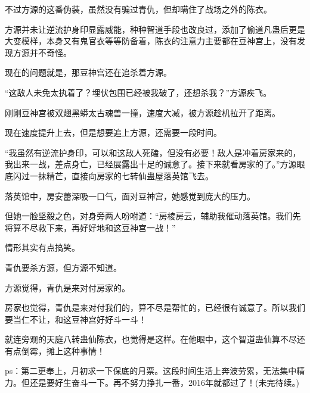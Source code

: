 \begin{this_body}
不过方源的这番伪装，虽然没有骗过青仇，但却瞒住了战场之外的陈衣。

方源并未让逆流护身印显露威能，种种智道手段也改良过，添加了偷道凡蛊后更是大变模样，本身又有鬼官衣等等防备着，陈衣的注意力主要都在豆神宫上，没有发现方源并不奇怪。

现在的问题就是，那豆神宫还在追杀着方源。

“这敌人未免太执着了？埋伏包围已经被我破了，还想杀我？”方源疾飞。

刚刚豆神宫被双翅黑蟒太古魂兽一撞，速度大减，被方源趁机拉开了距离。

现在速度提升上去，但是想要追上方源，还需要一段时间。

“我虽然有逆流护身印，可以和这敌人死磕，但没有必要！敌人是冲着房家来的，我出来一战，差点身亡，已经展露出十足的诚意了。接下来就看房家的了。”方源眼底闪过一抹精芒，直接向房家的七转仙蛊屋落英馆飞去。

落英馆中，房安蕾深吸一口气，面对豆神宫，她感觉到庞大的压力。

但她一脸坚毅之色，对身旁两人吩咐道：“房棱房云，辅助我催动落英馆。我们先将算不尽救下来，再好好地和这豆神宫一战！”

情形其实有点搞笑。

青仇要杀方源，但方源不知道。

方源觉得，青仇是来对付房家的。

房家也觉得，青仇是来对付我们的，算不尽是帮忙的，已经很有诚意了。所以我们要当仁不让，和这豆神宫好好斗一斗！

就连旁观的天庭八转蛊仙陈衣，也觉得是这样。在他眼中，这个智道蛊仙算不尽还有点倒霉，摊上这种事情！

ps：第二更奉上，月初求一下保底的月票。这段时间生活上奔波劳累，无法集中精力。但还是要好生奋斗一下。再不努力挣扎一番，2016年就都过了！(未完待续。)

\end{this_body}

